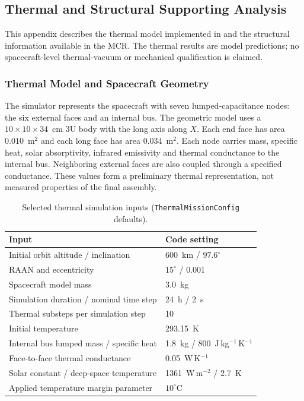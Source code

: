 
\subsection{Thermal and Structural Supporting Analysis}\label{app:thermal-structural}
This appendix describes the thermal model implemented in  and the structural information available in the MCR. The thermal results are model predictions; no spacecraft-level thermal-vacuum or mechanical qualification is claimed.
\subsubsection{Thermal Model and Spacecraft Geometry}\label{app:thermal-model}
The simulator represents the spacecraft with seven lumped-capacitance nodes: the six external faces and an internal bus. The geometric model uses a $10\times10\times34$~cm 3U body with the long axis along $X$. Each end face has area $0.010$~m$^2$ and each long face has area $0.034$~m$^2$. Each node carries mass, specific heat, solar absorptivity, infrared emissivity and thermal conductance to the internal bus. Neighboring external faces are also coupled through a specified conductance. These values form a preliminary thermal representation, not measured properties of the final assembly.
\begin{table}[htbp]\centering\caption{Selected thermal simulation inputs (\texttt{ThermalMissionConfig} defaults).}\label{tab:thermal-config}\begin{tabularx}{\linewidth}{Xl}\toprule Input & Code setting\\\midrule
Initial orbit altitude / inclination & 600~km / $97.6^\circ$\\
RAAN and eccentricity & $15^\circ$ / 0.001\\
Spacecraft model mass & 3.0~kg\\
Simulation duration / nominal time step & 24~h / 2~s\\
Thermal substeps per simulation step & 10\\
Initial temperature & 293.15~K\\
Internal bus lumped mass / specific heat & 1.8~kg / 800~J\,kg$^{-1}$\,K$^{-1}$\\
Face-to-face thermal conductance & 0.05~W\,K$^{-1}$\\
Solar constant / deep-space temperature & 1361~W\,m$^{-2}$ / 2.7~K\\
Applied temperature margin parameter & $10^\circ$C\\\bottomrule\end{tabularx}\end{table}

